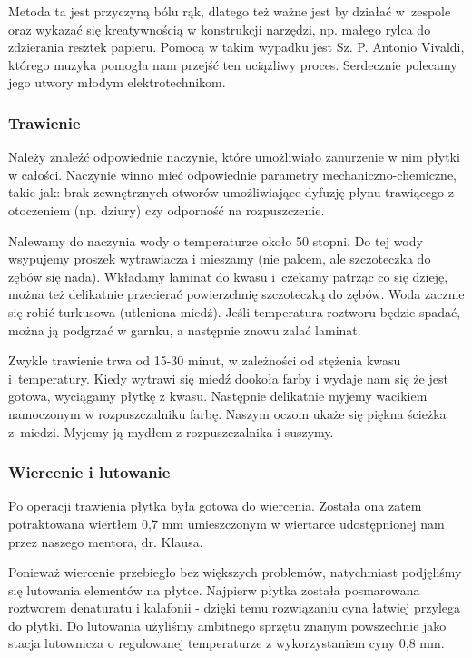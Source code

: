 Metoda ta jest przyczyną bólu rąk, dlatego też ważne jest by działać w~zespole oraz wykazać się kreatywnością w konstrukcji narzędzi, np. małego rylca do zdzierania resztek papieru. Pomocą w takim wypadku jest Sz. P. Antonio Vivaldi, którego muzyka pomogła nam przejść ten uciążliwy proces. Serdecznie polecamy jego utwory młodym elektrotechnikom.

\subsubsection{Trawienie}

Należy znaleźć odpowiednie naczynie, które umożliwiało zanurzenie w nim płytki w całości. Naczynie winno mieć odpowiednie parametry mechaniczno-chemiczne, takie jak: brak zewnętrznych otworów umożliwiające dyfuzję płynu trawiącego z otoczeniem (np. dziury) czy odporność na rozpuszczenie.

Nalewamy do naczynia wody o temperaturze około 50 stopni. Do tej wody wsypujemy proszek wytrawiacza i mieszamy (nie palcem, ale szczoteczka do zębów się nada). Wkładamy laminat do kwasu i~czekamy patrząc co się dzieję, można też delikatnie przecierać powierzchnię szczoteczką do zębów. Woda zacznie się robić turkusowa (utleniona miedź). Jeśli temperatura roztworu będzie spadać, można ją podgrzać w garnku, a następnie znowu zalać laminat. 

Zwykle trawienie trwa od 15-30 minut, w zależności od stężenia kwasu i~temperatury. Kiedy wytrawi się miedź dookoła farby i wydaje nam się że jest gotowa, wyciągamy płytkę z kwasu. Następnie delikatnie myjemy wacikiem namoczonym w rozpuszczalniku farbę. Naszym oczom ukaże się piękna ścieżka z~miedzi. Myjemy ją mydłem z rozpuszczalnika i suszymy.

\subsubsection{Wiercenie i lutowanie}

Po operacji trawienia płytka była gotowa do wiercenia. Została ona zatem potraktowana wiertłem 0,7 mm umieszczonym w wiertarce udostępnionej nam przez naszego mentora, dr. Klausa. 

Ponieważ wiercenie przebiegło bez większych problemów, natychmiast podjęliśmy się lutowania elementów na płytce. Najpierw płytka została posmarowana roztworem denaturatu i kalafonii - dzięki temu rozwiązaniu cyna łatwiej przylega do płytki. Do lutowania użyliśmy ambitnego sprzętu znanym powszechnie jako stacja lutownicza o regulowanej temperaturze z wykorzystaniem cyny 0,8 mm.

